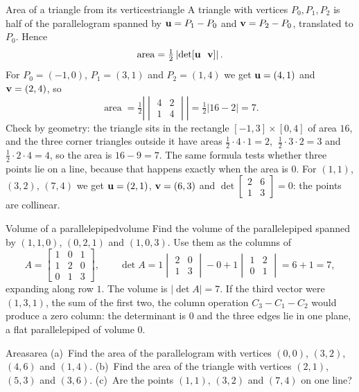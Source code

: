 \documentclass[11pt]{article}
\begin{document}
\begin{exmp}{Area of a triangle from its vertices}{triangle}
A triangle with vertices $P_0,P_1,P_2$ is half of the parallelogram spanned by $\mathbf{u}=P_1-P_0$ and $\mathbf{v}=P_2-P_0$, translated to $P_0$. Hence
\[
\operatorname{area}=\tfrac12\left|\det[\bv{u}\ \ \bv{v}]\right|.
\]
For $P_0=(-1,0)$, $P_1=(3,1)$ and $P_2=(1,4)$ we get $\mathbf{u}=(4,1)$ and $\mathbf{v}=(2,4)$, so
\[
\operatorname{area}=\tfrac12\left|\begin{vmatrix}4&2\\1&4\end{vmatrix}\right|=\tfrac12|16-2|=7.
\]
Check by geometry: the triangle sits in the rectangle $[-1,3]\times[0,4]$ of area $16$, and the three corner triangles outside it have areas $\tfrac12\cdot4\cdot1=2$, $\ \tfrac12\cdot3\cdot2=3$ and $\tfrac12\cdot2\cdot4=4$, so the area is $16-9=7$. The same formula tests whether three points lie on a line, because that happens exactly when the area is $0$. For $(1,1)$, $(3,2)$, $(7,4)$ we get $\mathbf{u}=(2,1)$, $\mathbf{v}=(6,3)$ and $\det\begin{bmatrix}2&6\\1&3\end{bmatrix}=0$: the points are collinear.
\end{exmp}

\begin{exmp}{Volume of a parallelepiped}{volume}
Find the volume of the parallelepiped spanned by $(1,1,0)$, $(0,2,1)$ and $(1,0,3)$. Use them as the columns of
\[
A=\begin{bmatrix}1&0&1\\1&2&0\\0&1&3\end{bmatrix},\qquad
\det A=1\begin{vmatrix}2&0\\1&3\end{vmatrix}-0+1\begin{vmatrix}1&2\\0&1\end{vmatrix}=6+1=7,
\]
expanding along row $1$. The volume is $|\det A|=7$. If the third vector were $(1,3,1)$, the sum of the first two, the column operation $C_3-C_1-C_2$ would produce a zero column: the determinant is $0$ and the three edges lie in one plane, a flat parallelepiped of volume $0$.
\end{exmp}

\begin{kc}{Areas}{area}
(a)~Find the area of the parallelogram with vertices $(0,0)$, $(3,2)$, $(4,6)$ and $(1,4)$. (b)~Find the area of the triangle with vertices $(2,1)$, $(5,3)$ and $(3,6)$. (c)~Are the points $(1,1)$, $(3,2)$ and $(7,4)$ on one line?
\end{kc}
\end{document}
